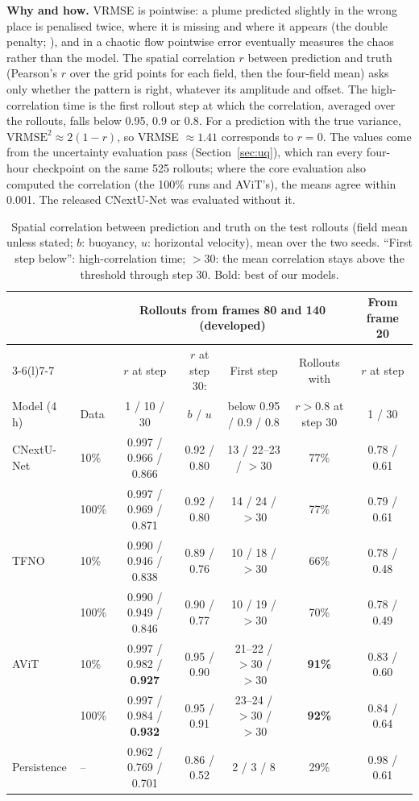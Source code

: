 \documentclass[11pt]{article}
\begin{document}
\textbf{Why and how.} VRMSE is pointwise: a plume predicted slightly in the wrong place is penalised twice, where it is
missing and where it appears (the double penalty; \citealp{gilleland2009verification}), and in a chaotic flow pointwise
error eventually measures the chaos rather than the model. The spatial correlation $r$ between prediction and truth
(Pearson's $r$ over the grid points for each field, then the four-field mean) asks only whether the pattern is right,
whatever its amplitude and offset. The high-correlation time is the first rollout step at which the correlation,
averaged over the rollouts, falls below 0.95, 0.9 or 0.8. For a prediction with the true variance,
$\mathrm{VRMSE}^2\approx2(1-r)$, so VRMSE $\approx1.41$ corresponds to $r=0$. The values come from the
uncertainty evaluation pass (Section~\ref{sec:uq}), which ran every four-hour checkpoint on the same 525 rollouts;
where the core evaluation also computed the correlation (the 100\% runs and AViT's), the means agree within 0.001. The
released
CNextU-Net was evaluated without it.

\begin{table}[tp]
\centering\footnotesize
\setlength{\tabcolsep}{4pt}
\begin{tabular}{@{}llccccc@{}}
\toprule
& & \multicolumn{4}{c}{Rollouts from frames 80 and 140 (developed)} & From frame 20 \\
\cmidrule(lr){3-6}\cmidrule(l){7-7}
& & $r$ at step & $r$ at step 30: & First step & Rollouts with & $r$ at step \\
Model (4 h) & Data & 1 / 10 / 30 & $b$ / $u$ & below 0.95 / 0.9 / 0.8 & $r>0.8$ at step 30 & 1 / 30 \\
\midrule
CNextU-Net & 10\% & 0.997 / 0.966 / 0.866 & 0.92 / 0.80 & 13 / 22--23 / $>$30 & 77\% & 0.78 / 0.61 \\
           & 100\% & 0.997 / 0.969 / 0.871 & 0.92 / 0.80 & 14 / 24 / $>$30 & 77\% & 0.79 / 0.61 \\
TFNO & 10\% & 0.990 / 0.946 / 0.838 & 0.89 / 0.76 & 10 / 18 / $>$30 & 66\% & 0.78 / 0.48 \\
     & 100\% & 0.990 / 0.949 / 0.846 & 0.90 / 0.77 & 10 / 19 / $>$30 & 70\% & 0.78 / 0.49 \\
AViT & 10\% & 0.997 / 0.982 / \textbf{0.927} & 0.95 / 0.90 & 21--22 / $>$30 / $>$30 & \textbf{91\%} & 0.83 / 0.60 \\
     & 100\% & 0.997 / 0.984 / \textbf{0.932} & 0.95 / 0.91 & 23--24 / $>$30 / $>$30 & \textbf{92\%} & 0.84 / 0.64 \\
\midrule
Persistence & -- & 0.962 / 0.769 / 0.701 & 0.86 / 0.52 & 2 / 3 / 8 & 29\% & 0.98 / 0.61 \\
\bottomrule
\end{tabular}
\caption{Spatial correlation between prediction and truth on the test rollouts (field mean unless stated; $b$:
buoyancy, $u$: horizontal velocity), mean over the two seeds. ``First step below'': high-correlation time; $>$30: the
mean correlation stays above the threshold through step 30. Bold: best of our models.}
\label{tab:corr}
\end{table}
\end{document}
